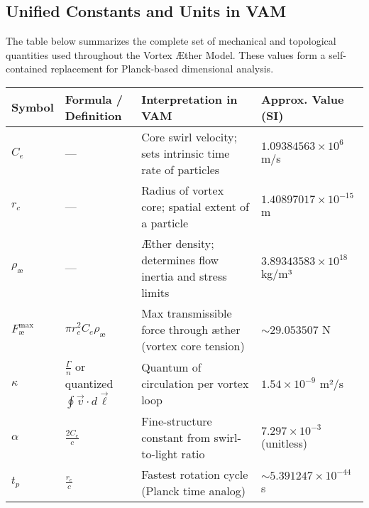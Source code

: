 \subsection*{Unified Constants and Units in VAM}

The table below summarizes the complete set of mechanical and topological quantities used throughout the Vortex Æther Model. These values form a self-contained replacement for Planck-based dimensional analysis.


\begin{table}[H]
    \centering
    \footnotesize
    \renewcommand{\arraystretch}{1.3}
    \begin{tabular}{|l|l|l|l|}
        \hline
        \textbf{Symbol} & \textbf{Formula / Definition} & \textbf{Interpretation in VAM} & \textbf{Approx. Value (SI)} \\
        \hline

        $C_e$ &
        — &
        Core swirl velocity; sets intrinsic time rate of particles &
        $1.09384563 \times 10^6$ m/s \\
        \hline

        $r_c$ &
        — &
        Radius of vortex core; spatial extent of a particle &
        $1.40897017 \times 10^{-15}$ m \\
        \hline

        $\rho_\text{\ae}$ &
        — &
        Æther density; determines flow inertia and stress limits &
        $3.89343583 \times 10^{18}$ kg/m³ \\
        \hline

        $F^{\text{max}}_{\text{\ae}}$ &
        $\pi r_c^2 C_e \rho_\text{\ae}$ &
        Max transmissible force through æther (vortex core tension) &
        $\sim 29.053507$ N \\
        \hline

        $\kappa$ &
        $\frac{\Gamma}{n}$ or quantized $\oint \vec{v} \cdot d\vec{\ell}$ &
        Quantum of circulation per vortex loop &
        $1.54 \times 10^{-9}$ m²/s \\
        \hline

        $\alpha$ &
        $\frac{2 C_e}{c}$ &
        Fine-structure constant from swirl-to-light ratio &
        $7.297 \times 10^{-3}$ (unitless) \\
        \hline

        $t_p$ &
        $\frac{r_c}{c}$ &
        Fastest rotation cycle (Planck time analog) &
        $\sim 5.391247 \times 10^{-44}$ s \\
        \hline


\end{tabular}
\end{table}
